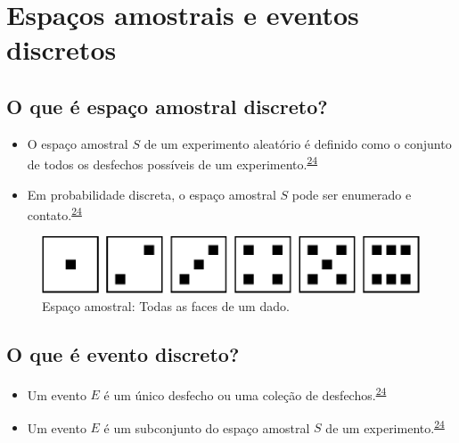 \documentclass[
  a4paper,
]{book}
\begin{document}
\hypertarget{espacos-eventos-discretos}{%
\section{Espaços amostrais e eventos discretos}\label{espacos-eventos-discretos}}

\hypertarget{o-que-uxe9-espauxe7o-amostral-discreto}{%
\subsection{O que é espaço amostral discreto?}\label{o-que-uxe9-espauxe7o-amostral-discreto}}

\begin{itemize}
\item
  O espaço amostral \(S\) de um experimento aleatório é definido como o conjunto de todos os desfechos possíveis de um experimento.\textsuperscript{\protect\hyperlink{ref-grami2023}{24}}
\item
  Em probabilidade discreta, o espaço amostral \(S\) pode ser enumerado e contato.\textsuperscript{\protect\hyperlink{ref-grami2023}{24}}
\end{itemize}

\begin{figure}

{\centering \includegraphics{Ciencia-com-R_files/figure-latex/espaco-amostral-dado-1} 

}

\caption{Espaço amostral: Todas as faces de um dado.}\label{fig:espaco-amostral-dado}
\end{figure}

\hypertarget{o-que-uxe9-evento-discreto}{%
\subsection{O que é evento discreto?}\label{o-que-uxe9-evento-discreto}}

\begin{itemize}
\item
  Um evento \(E\) é um único desfecho ou uma coleção de desfechos.\textsuperscript{\protect\hyperlink{ref-grami2023}{24}}
\item
  Um evento \(E\) é um subconjunto do espaço amostral \(S\) de um experimento.\textsuperscript{\protect\hyperlink{ref-grami2023}{24}}
\end{itemize}
\end{document}
